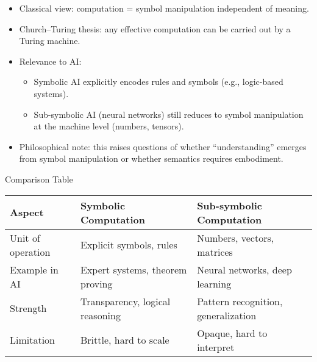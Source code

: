 \documentclass[
  letterpaper,
  DIV=11,
  numbers=noendperiod]{scrreprt}
\providecommand{\tightlist}{%
  \setlength{\itemsep}{0pt}\setlength{\parskip}{0pt}}
\begin{document}
\begin{itemize}
\item
  Classical view: computation = symbol manipulation independent of
  meaning.
\item
  Church--Turing thesis: any effective computation can be carried out by
  a Turing machine.
\item
  Relevance to AI:

  \begin{itemize}
  \tightlist
  \item
    Symbolic AI explicitly encodes rules and symbols (e.g., logic-based
    systems).
  \item
    Sub-symbolic AI (neural networks) still reduces to symbol
    manipulation at the machine level (numbers, tensors).
  \end{itemize}
\item
  Philosophical note: this raises questions of whether ``understanding''
  emerges from symbol manipulation or whether semantics requires
  embodiment.
\end{itemize}

Comparison Table

\begin{longtable}[]{@{}
  >{\raggedright\arraybackslash}p{}
  >{\raggedright\arraybackslash}p{}
  >{\raggedright\arraybackslash}p{}@{}}
\toprule\noalign{}
\begin{minipage}[b]{\linewidth}\raggedright
Aspect
\end{minipage} & \begin{minipage}[b]{\linewidth}\raggedright
Symbolic Computation
\end{minipage} & \begin{minipage}[b]{\linewidth}\raggedright
Sub-symbolic Computation
\end{minipage} \\
\midrule\noalign{}
\endhead
\bottomrule\noalign{}
\endlastfoot
Unit of operation & Explicit symbols, rules & Numbers, vectors,
matrices \\
Example in AI & Expert systems, theorem proving & Neural networks, deep
learning \\
Strength & Transparency, logical reasoning & Pattern recognition,
generalization \\
Limitation & Brittle, hard to scale & Opaque, hard to interpret \\
\end{longtable}
\end{document}
